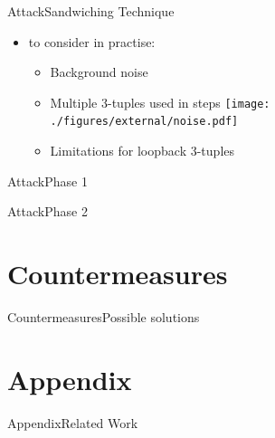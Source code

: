 \documentclass[aspectratio=169, hyperref={colorlinks=true, allcolors=SecondaryColor}, c]{beamer}
\begin{document}
\begin{frame}[fragile]{Attack}{Sandwiching Technique}
	\begin{itemize}
		\item to consider in practise:
		\begin{itemize}
			\item \alert{Background noise}
			\item \alert{Multiple 3-tuples used in steps}
			\texttt{[image: ./figures/external/noise.pdf]}
			\item \alert{Limitations for loopback 3-tuples}
		\end{itemize}
	\end{itemize}
\end{frame}

\ifattackphaseone
	\begin{frame}[fragile]{Attack}{Phase 1}
		\begin{center}
			\begin{adjustbox}{scale=0.7}
				
			\end{adjustbox}
		\end{center}
	\end{frame}
\else
\fi

\ifattackphaseone
	\begin{frame}[fragile]{Attack}{Phase 2}
		\begin{center}
			\begin{adjustbox}{scale=0.7}
				
			\end{adjustbox}
		\end{center}
	\end{frame}
\else
\fi

\ifcountermeasures
	\section{Countermeasures}

	\begin{frame}[fragile]{Countermeasures}{Possible solutions}
	\end{frame}
\else
\fi

\ifappendix
	\section{Appendix}

	\begin{frame}[fragile]{Appendix}{Related Work}
	\end{frame}
\end{document}
